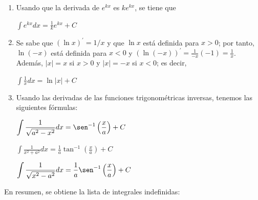 \begin{enumerate}[leftmargin=1.2em,   itemindent=0pt,       labelwidth=\labelwidth,labelsep=0.5em,]
\item Usando que la derivada de $e^{kx}$ es $k e^{kx}$, se tiene que
\begin{center}
$\displaystyle{\int e^{kx}dx=\frac{1}{k}e^{kx}+C}$
\end{center}

\item Se sabe que {\small $(\ln x)^\prime=1/x$} y que {\small $\ln x$} está definida para {\small $x>0$}; por tanto, {\small $\ln(-x)$} está definida para {\small $x< 0$} y {\small $(\ln(-x))^\prime=\frac{1}{-x}(-1)=\frac{1}{x}$}. Además, {\small $\vert x\vert=x$} si {\small $x>0$} y {\small $\vert x\vert=-x$} si {\small $x<0$}; es decir,
\begin{center}
$\displaystyle{\int \frac{1}{x}dx=\ln \left\vert x\right\vert +C}$
\end{center}

\item Usando las derivadas de las funciones trigonométricas inversas, tenemos las siguientes fórmulas:
{\small
\begin{center}
$\displaystyle{\int \frac{1}{\sqrt{a^{2}-x^{2}}}dx=\sen^{-1} \left(\frac{x}{a}\right)+C}$
\end{center}

\begin{center}
$\displaystyle{\int \frac{1}{x^{2}+a^{2}}dx=\frac{1}{a}\tan^{-1} \left(\frac{x}{a}\right)+C}$
\end{center}

\begin{center}
$\displaystyle{\int \frac{1}{\sqrt{x^{2}-a^{2}}}dx=\frac{1}{a}\sen^{-1} \left(\frac{x}{a}\right)+C}$
\end{center}
}
\end{enumerate}

En resumen, se obtiene la lista de integrales indefinidas\label{TablaResumen}:

